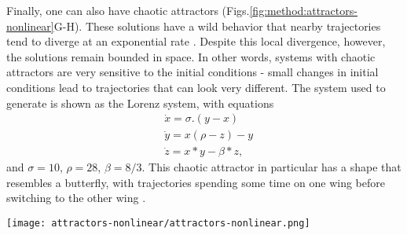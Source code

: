 Finally, one can also have chaotic attractors (Figs.\ref{fig:method:attractors-nonlinear}G-H). These solutions have a wild behavior that nearby trajectories tend to diverge at an exponential rate \cite{}. Despite this local divergence, however, the solutions remain bounded in space. 
In other words, systems with chaotic attractors are very sensitive to the initial conditions - small changes in initial conditions lead to trajectories that can look very different.  
The system used to generate is shown as the Lorenz system, with equations 
%
\begin{align}
    &\dot{x} = \sigma. (y-x) \\ 
    &\dot{y} = x(\rho-z) - y \\ 
    &\dot{z} = x*y -\beta*z,
    \label{eq:lorenz}
\end{align}
and $\sigma = 10$, $\rho = 28$, $\beta = 8/3$. This chaotic attractor in particular has a shape that resembles a butterfly, with trajectories spending some time on one wing before switching to the other wing \cite{argyrisbook}. 



\begin{figure*}[htb!]
    \centering 
    \texttt{[image: attractors-nonlinear/attractors-nonlinear.png]}
    \caption{\textbf{Basic types of attractors in nonlinear dynamical systems}. Each column shows respectively the state space and a time-series of a typical trajectory converging to a type of attractor. The first column corresponds to the neuronal model of Eq.\ref{eq:inapk} with $I=2.0$, which has excitable dynamics, converging to a stable equilibrium. The second column shows again the neuronal system of Eq.\ref{eq:inapk} but with $I=6.0$, when the attractor is now a stable limit cycle. The third column shows the system defined in Eqs.\ref{eq:vanderpol}, with a quasiperiodic attractor Finally, column four has an example of a chaotic trajectory on the Lorenz system (Eq.~\ref{eq:lorenz}).}
    \label{fig:method:attractors-nonlinear}    
\end{figure*}



